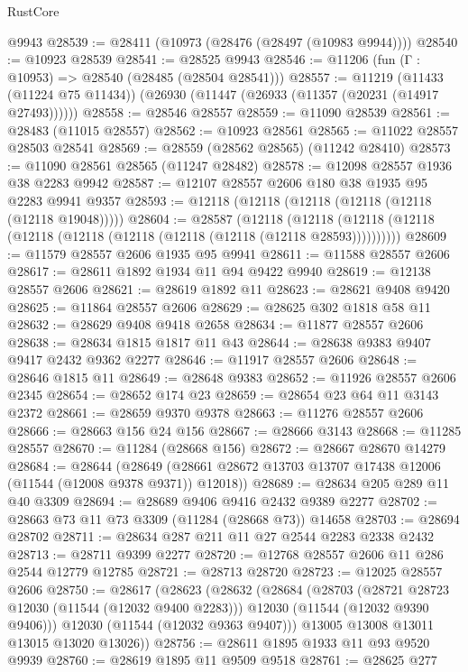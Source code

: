 \begin{lexlean}{RustCore}
\begin{coremodule}
    @9943
@28539 := @28411 (@10973 (@28476 (@28497 (@10983 @9944))))
@28540 := @10923 @28539
@28541 := @28525 @9943
@28546 := @11206 (fun (Γ : @10953) => @28540 (@28485 (@28504 @28541)))
@28557 := @11219
    (@11433 (@11224 @75 @11434))
    (@26930 (@11447 (@26933 (@11357 (@20231 (@14917 @27493))))))
@28558 := @28546 @28557
@28559 := @11090 @28539
@28561 := @28483 (@11015 @28557)
@28562 := @10923 @28561
@28565 := @11022 @28557 @28503 @28541
@28569 := @28559 (@28562 @28565) (@11242 @28410)
@28573 := @11090 @28561 @28565 (@11247 @28482)
@28578 := @12098 @28557 @1936 @38 @2283 @9942
@28587 := @12107 @28557 @2606 @180 @38 @1935 @95 @2283 @9941 @9357
@28593 := @12118 (@12118 (@12118 (@12118 (@12118 (@12118 @19048)))))
@28604 := @28587
    (@12118 (@12118 (@12118 (@12118 (@12118 (@12118 (@12118 (@12118 (@12118 (@12118 @28593))))))))))
@28609 := @11579 @28557 @2606 @1935 @95 @9941
@28611 := @11588 @28557 @2606
@28617 := @28611 @1892 @1934 @11 @94 @9422 @9940
@28619 := @12138 @28557 @2606
@28621 := @28619 @1892 @11
@28623 := @28621 @9408 @9420
@28625 := @11864 @28557 @2606
@28629 := @28625 @302 @1818 @58 @11
@28632 := @28629 @9408 @9418 @2658
@28634 := @11877 @28557 @2606
@28638 := @28634 @1815 @1817 @11 @43
@28644 := @28638 @9383 @9407 @9417 @2432 @9362 @2277
@28646 := @11917 @28557 @2606
@28648 := @28646 @1815 @11
@28649 := @28648 @9383
@28652 := @11926 @28557 @2606 @2345
@28654 := @28652 @174 @23
@28659 := @28654 @23 @64 @11 @3143 @2372
@28661 := @28659 @9370 @9378
@28663 := @11276 @28557 @2606
@28666 := @28663 @156 @24 @156
@28667 := @28666 @3143
@28668 := @11285 @28557
@28670 := @11284 (@28668 @156)
@28672 := @28667 @28670 @14279
@28684 := @28644
    (@28649 (@28661 @28672 @13703 @13707 @17438 @12006 (@11544 (@12008 @9378 @9371)) @12018))
@28689 := @28634 @205 @289 @11 @40 @3309
@28694 := @28689 @9406 @9416 @2432 @9389 @2277
@28702 := @28663 @73 @11 @73 @3309 (@11284 (@28668 @73)) @14658
@28703 := @28694 @28702
@28711 := @28634 @287 @211 @11 @27 @2544 @2283 @2338 @2432
@28713 := @28711 @9399 @2277
@28720 := @12768 @28557 @2606 @11 @286 @2544 @12779 @12785
@28721 := @28713 @28720
@28723 := @12025 @28557 @2606
@28750 := @28617
    (@28623
      (@28632
        (@28684
          (@28703
            (@28721 @28723 @12030 (@11544 (@12032 @9400 @2283)))
            @12030
            (@11544 (@12032 @9390 @9406)))
          @12030
          (@11544 (@12032 @9363 @9407)))
        @13005
        @13008
        @13011
        @13015
        @13020
        @13026))
@28756 := @28611 @1895 @1933 @11 @93 @9520 @9939
@28760 := @28619 @1895 @11 @9509 @9518
@28761 := @28625 @277

\end{coremodule}
\end{lexlean}
